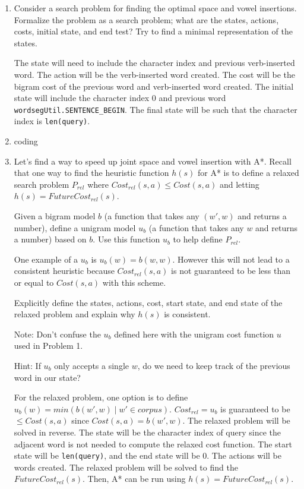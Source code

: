 \documentclass[10pt]{article}
\begin{document}
\begin{enumerate}[label=(\alph*)]

  \item Consider a search problem for finding the optimal space and vowel insertions. Formalize the problem as a search problem; what are the states, actions, costs, initial state, and end test? Try to find a minimal representation of the states.
  
  The state will need to include the character index and previous verb-inserted word. The action will be the verb-inserted word created. The cost will be the bigram cost of the previous word and verb-inserted word created. The initial state will include the character index 0 and previous word \texttt{wordsegUtil.SENTENCE\_BEGIN}. The final state will be such that the character index is \texttt{len(query)}.
  
  \item coding
  
  \item  Let's find a way to speed up joint space and vowel insertion with A*. Recall that one way to find the heuristic function $h(s)$ for A* is to define a relaxed search problem $P_{rel}$ where $Cost_{rel}(s,a) \leq Cost(s,a)$ and letting $h(s)=FutureCost_{rel}(s)$.

Given a bigram model $b$ (a function that takes any $(w',w)$ and returns a number), define a unigram model $u_b$ (a function that takes any $w$ and returns a number) based on $b$. Use this function $u_b$ to help define $P_{rel}$.

One example of a $u_b$ is $u_b(w)=b(w,w)$. However this will not lead to a consistent heuristic because $Cost_{rel}(s,a)$ is not guaranteed to be less than or equal to $Cost(s,a)$ with this scheme.

Explicitly define the states, actions, cost, start state, and end state of the relaxed problem and explain why $h(s)$ is consistent.

Note: Don't confuse the $u_b$ defined here with the unigram cost function $u$ used in Problem 1.

Hint: If $u_b$ only accepts a single $w$, do we need to keep track of the previous word in our state?

	For the relaxed problem, one option is to define $u_b(w) = min (b(w', w) \mid w' \in corpus)$. $Cost_{rel} = u_b$ is guaranteed to be $\leq Cost(s,a)$ since $Cost(s,a) = b(w', w)$. The relaxed problem will be solved in reverse. The state will be the character index of query since the adjacent word is not needed to compute the relaxed cost function. The start state will be \texttt{len(query)}, and the end state will be 0. The actions will be words created. The relaxed problem will be solved to find the $FutureCost_{rel}(s)$. Then, A* can be run using $h(s) = FutureCost_{rel}(s)$.


\end{enumerate}
\end{document}
